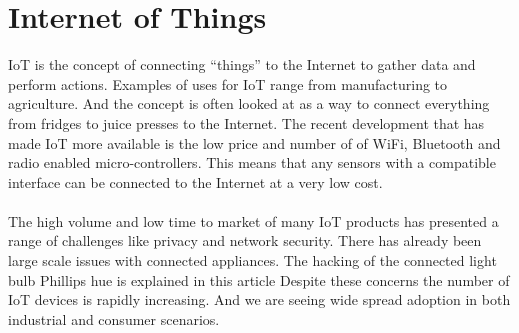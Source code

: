 \documentclass[]{uiophd}
\begin{document}
\section{Internet of Things}
IoT is the concept of connecting “things” to the Internet to gather data and perform actions. Examples of uses for IoT range from manufacturing to agriculture. And the concept is often looked at as a way to connect everything from fridges to juice presses to the Internet. The recent development that has made IoT more available is the low price and number of of WiFi, Bluetooth and radio enabled micro-controllers.  This means that any sensors with a compatible interface can be connected to the Internet at a very low cost.
\\\\
The high volume and low time to market of many IoT products has presented a range of challenges like privacy and network security. There has already been large scale issues with connected appliances. The hacking of the connected light bulb Phillips hue is explained in this article \cite{6997469} Despite these concerns the number of IoT devices is rapidly increasing. And we are seeing wide spread adoption in both industrial and consumer scenarios. 
\end{document}
